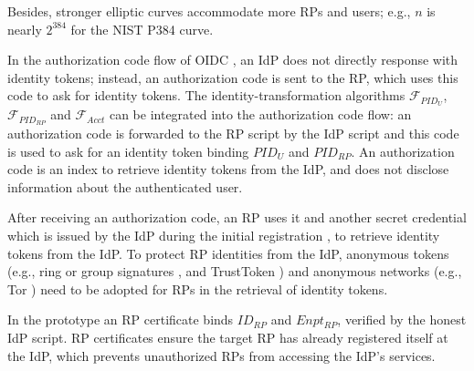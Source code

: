 Besides, stronger elliptic curves accommodate more RPs and users;
e.g., $n$ is nearly $2^{384}$ for the NIST P384 curve.


\vspace{0.75mm}
In the authorization code flow of OIDC \cite{OpenIDConnect},
    an IdP does not directly response with identity tokens;
        instead,
            an authorization code is sent to the RP,
            which uses this code to ask for identity tokens.
The identity-transformation algorithms $\mathcal{F}_{PID_{U}}$, $\mathcal{F}_{PID_{RP}}$ and $\mathcal{F}_{Acct}$
    can be integrated into the authorization code flow:
            an authorization code is forwarded to the RP script by the IdP script
                and this code is used to ask for an identity token binding $PID_U$ and $PID_{RP}$.
An authorization code is an index to retrieve identity tokens from the IdP,
        and does not disclose information about the authenticated user.


After receiving an authorization code, an RP uses it and another secret credential
         which is issued by the IdP during the initial registration \cite{OpenIDConnect},
     to retrieve identity tokens from the IdP.
To protect RP identities from the IdP,
        anonymous tokens (e.g., ring or group signatures \cite{ring-sig,chaum1991group},
         and TrustToken \cite{trusttoken})
        and anonymous networks (e.g., Tor \cite{tor}) need to be adopted for RPs
         in the retrieval of identity tokens.

\vspace{0.75mm}
In the prototype an RP certificate binds $ID_{RP}$ and $Enpt_{RP}$,
    verified by the honest IdP script.
RP certificates ensure the target RP has already registered itself at the IdP,
 which prevents unauthorized RPs from accessing the IdP's services.

